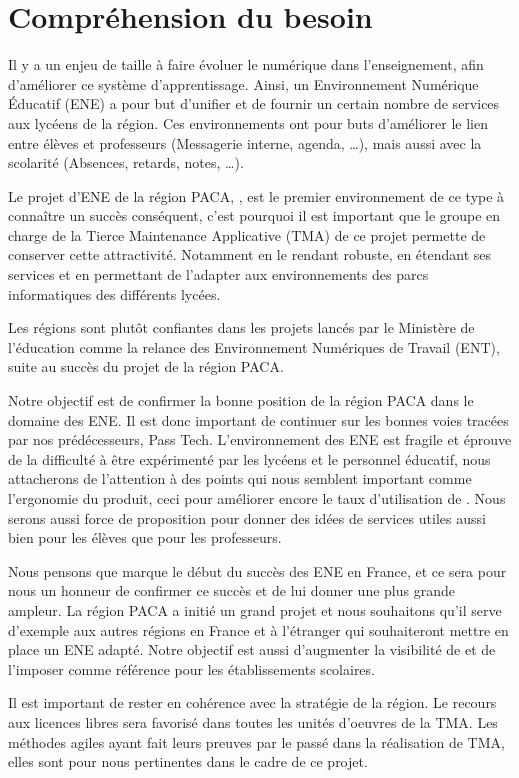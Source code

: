 \section{Compréhension du besoin}
Il y a un enjeu de taille à faire évoluer le numérique dans l’enseignement, afin d’améliorer ce système d’apprentissage.  
Ainsi, un Environnement Numérique Éducatif (ENE) a pour but d’unifier et de fournir un certain nombre de services aux lycéens de la région. Ces environnements ont pour buts d’améliorer le lien entre élèves et professeurs (Messagerie interne, agenda, …), mais aussi avec la scolarité (Absences, retards, notes, …).

Le projet d’ENE de la région PACA, \correlyce{}, est le premier environnement de ce type à connaître un succès conséquent, c’est pourquoi il est important que le groupe en charge de la Tierce Maintenance Applicative (TMA) de ce projet permette de conserver cette attractivité. Notamment en le rendant robuste, en étendant ses services et en permettant de l’adapter aux environnements des parcs informatiques des différents lycées.

Les régions sont plutôt confiantes dans les projets lancés par le Ministère de l'éducation comme la relance des Environnement Numériques de Travail (ENT), suite au succès du projet de la région PACA. 

Notre objectif est de confirmer la bonne position de la région PACA dans le domaine des ENE. Il est donc important de continuer sur les bonnes voies tracées par nos prédécesseurs, Pass Tech. 
L’environnement des ENE est fragile et éprouve de la difficulté à être expérimenté par les lycéens et le personnel éducatif, nous attacherons de l’attention à des points qui nous semblent important comme l’ergonomie du produit, ceci pour améliorer encore le taux d’utilisation de \correlyce{}. Nous serons aussi force de proposition pour donner des idées de services utiles aussi bien pour les élèves que pour les professeurs.

 Nous pensons que \correlyce{} marque le début du succès des ENE en France, et ce sera pour nous un honneur de confirmer ce succès et de lui donner une plus grande ampleur. La région PACA a initié un grand projet et nous souhaitons qu’il serve d’exemple aux autres régions en France et à l’étranger qui souhaiteront mettre en place un ENE adapté. Notre objectif est aussi d’augmenter la visibilité de \correlyce{} et de l’imposer comme référence pour les établissements scolaires.

Il est important de rester en cohérence avec la stratégie de la région. Le recours aux licences libres sera favorisé dans toutes les unités d’oeuvres de la TMA. Les méthodes agiles ayant fait leurs preuves par le passé dans la réalisation de TMA, elles sont pour nous pertinentes dans le cadre de ce projet.